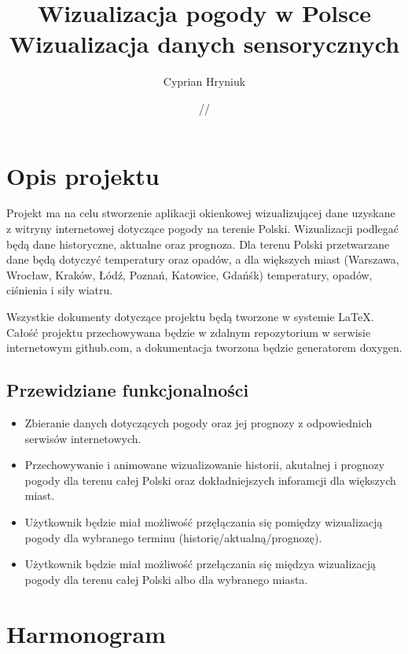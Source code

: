 \documentclass[10pt, a4paper]{article}
\title{\vspace{175pt}\textbf{Wizualizacja pogody w Polsce\\}  \small{\vspace{10pt}Wizualizacja danych sensorycznych}}
\author{Cyprian Hryniuk}
\date{\oldstylenums{20}/\oldstylenums{03}/\oldstylenums{19}}
\begin{document}
\begin{titlepage}
\maketitle
\thispagestyle{empty}
\end{titlepage}

\newpage
\tableofcontents
\newpage
\section{Opis projektu}
\label{sec:opisprojektu}
\indent

Projekt ma na celu stworzenie aplikacji okienkowej wizualizującej dane uzyskane z witryny internetowej dotyczące pogody na terenie Polski. Wizualizacji podlegać będą dane historyczne, aktualne oraz prognoza. Dla terenu Polski przetwarzane dane będą dotyczyć temperatury oraz opadów, a dla większych miast (Warszawa, Wrocław, Kraków, Łódź, Poznań, Katowice, Gdańśk) temperatury, opadów, ciśnienia i siły wiatru. 

Wszystkie dokumenty dotyczące projektu będą tworzone w systemie \LaTeX. Całość projektu przechowywana będzie w zdalnym repozytorium w serwisie internetowym github.com, a dokumentacja tworzona będzie generatorem doxygen. 

\subsection{Przewidziane funkcjonalności}
\label{ssec:funkc}
\begin{itemize}
  \item Zbieranie danych dotyczących pogody oraz jej prognozy z odpowiednich serwisów internetowych.
  \item Przechowywanie i animowane wizualizowanie historii, akutalnej i prognozy pogody dla terenu całej Polski oraz dokładniejszych inforamcji dla większych miast.
  \item Użytkownik będzie miał możliwość przęłączania się pomiędzy wizualizacją pogody dla wybranego terminu (historię/aktualną/prognozę). 
  \item Użytkownik będzie miał możliwość przełączania się międzya wizualizacją pogody dla terenu całej Polski albo dla wybranego miasta.
  
\end{itemize}

\section{Harmonogram}
\label{sec:harmonogram}
\end{document}
